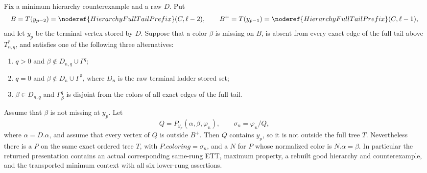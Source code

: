 \begin{lemma}
Fix a minimum hierarchy counterexample and a raw
 \(D\).  Put
\[
 B=T(y_{p-2})=\noderef{HierarchyFullTailPrefix}(C,\ell-2),
 \qquad
 B^+=T(y_{p-1})=\noderef{HierarchyFullTailPrefix}(C,\ell-1),
\]
and let \(y_p\) be the terminal vertex stored by \(D\).  Suppose that a
color \(\beta\) is missing on \(B\), is absent from every exact edge of
the full tail above \(T_{n,q}^{*}\), and satisfies one of the following
three alternatives:
\begin{enumerate}
\item \(q>0\) and
      \(\beta\notin D_{n,q}\cup\Gamma^q\);
\item \(q=0\) and
      \(\beta\notin D_n\cup\Gamma^0\), where \(D_n\) is the raw terminal
      ladder stored set;
\item \(\beta\in D_{n,q}\) and
      \(\Gamma^q_\beta\) is disjoint from the colors of all exact edges
      of the full tail.
\end{enumerate}
Assume that \(\beta\) is not missing at \(y_p\).  Let
\[
 Q=P_{y_p}(\alpha,\beta,\varphi_n),
 \qquad
 \sigma_n=\varphi_n/Q,
\]
where \(\alpha=D.\alpha\), and assume that every vertex of \(Q\) is
outside \(B^+\).  Then \(Q\) contains \(y_p\), so it is not outside the
full tree \(T\).  Nevertheless there is a
 \(P\) on the same exact
ordered tree \(T\), with \(P.\mathit{coloring}=\sigma_n\), and a
 \(N\) for \(P\)
whose normalized color is \(N.\alpha=\beta\).  In particular the returned
presentation contains an actual corresponding same-rung ETT, maximum
property, a rebuilt good hierarchy and counterexample, and the transported
minimum context with all six lower-rung assertions.
\end{lemma}
